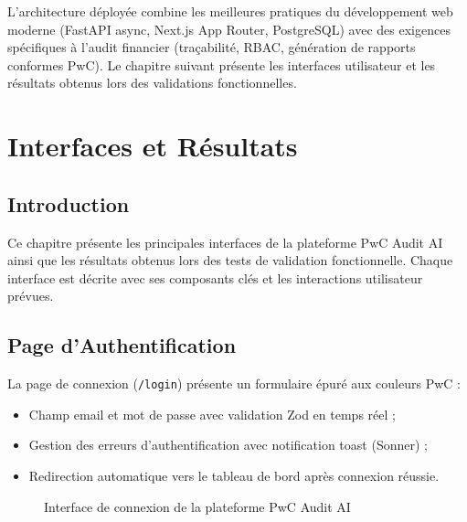 \documentclass[12pt,a4paper,twoside]{report}
\theoremstyle{definition}
\begin{document}
L'architecture déployée combine les meilleures pratiques du développement web
moderne (FastAPI async, Next.js App Router, PostgreSQL) avec des exigences
spécifiques à l'audit financier (traçabilité, RBAC, génération de rapports
conformes PwC). Le chapitre suivant présente les interfaces utilisateur
et les résultats obtenus lors des validations fonctionnelles.

\chapter{Interfaces et Résultats}

\section{Introduction}

Ce chapitre présente les principales interfaces de la plateforme PwC Audit AI
ainsi que les résultats obtenus lors des tests de validation fonctionnelle.
Chaque interface est décrite avec ses composants clés et les interactions
utilisateur prévues.

\section{Page d'Authentification}

La page de connexion (\texttt{/login}) présente un formulaire épuré aux
couleurs PwC :

\begin{itemize}
  \item Champ email et mot de passe avec validation Zod en temps réel ;
  \item Gestion des erreurs d'authentification avec notification toast (Sonner) ;
  \item Redirection automatique vers le tableau de bord après connexion réussie.
\end{itemize}

\begin{figure}[H]
\centering
{}
\caption{Interface de connexion de la plateforme PwC Audit AI}
\label{fig:ui_login}
\end{figure}
\end{document}
